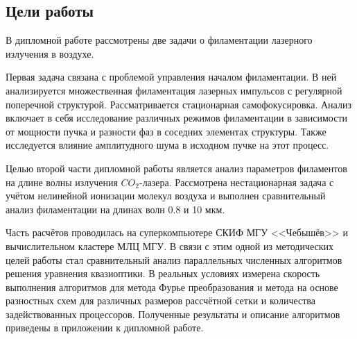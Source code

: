 \cleardoublepage
{}
\subsection*{Цели работы}

В дипломной работе рассмотрены две задачи о филаментации лазерного излучения в воздухе.


Первая задача связана с проблемой управления началом филаментации. В ней анализируется
множественная филаментация лазерных импульсов с регулярной поперечной структурой.
Рассматривается стационарная самофокусировка. Анализ включает в себя исследование различных режимов
филаментации в зависимости от мощности пучка и разности фаз в соседних элементах структуры.
Также исследуется влияние амплитудного шума в исходном пучке на этот процесс.


Целью второй части дипломной работы является анализ параметров филаментов на длине волны излучения
$CO_2$-лазера. Рассмотрена нестационарная задача с учётом нелинейной ионизации молекул воздуха
и выполнен сравнительный анализ филаментации на длинах волн 0.8 и 10 мкм.


Часть расчётов проводилась на суперкомпьютере СКИФ МГУ <<Чебышёв>> и вычислительном кластере МЛЦ МГУ.
В связи с этим одной из методических целей работы стал сравнительный анализ параллельных численных
алгоритмов решения уравнения квазиоптики. В реальных условиях измерена скорость выполнения алгоритмов
для метода Фурье преобразования и метода на основе разностных схем для различных размеров рассчётной сетки
и количества задействованных процессоров. Полученные результаты и описание алгоритмов приведены
в приложении к дипломной работе.


\renewcommand{\theequation}{\arabic{section}.\arabic{subsection}.\arabic{equation}}

